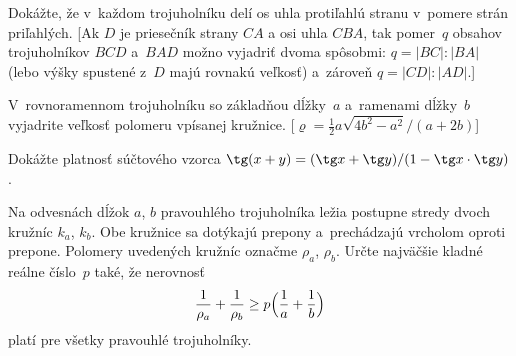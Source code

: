 {
Dokážte, že v~každom trojuholníku delí os uhla protiľahlú stranu v~pomere strán priľahlých. [Ak $D$ je priesečník strany $CA$ a osi uhla $CBA$, tak pomer~$q$ obsahov trojuholníkov $BCD$ a~$BAD$ možno vyjadriť dvoma spôsobmi: $q=|BC|:|BA|$ (lebo výšky spustené z~$D$ majú rovnakú veľkosť) a~zároveň $q=|CD|:|AD|$.]

V~rovnoramennom trojuholníku so základňou dĺžky~$a$ a~ramenami dĺžky~$b$ vyjadrite veľkosť polomeru vpísanej kružnice. [$\varrho=\frac12a\sqrt{4b^2-a^2}/(a+2b)$]

Dokážte platnosť súčtového vzorca $\tg(x+y)=(\tg x+\tg y)/(1-\tg x\cdot\tg y)$.

\D
Na odvesnách dĺžok $a$, $b$ pravouhlého trojuholníka ležia postupne stredy dvoch kružníc $k_a$, $k_b$. Obe kružnice sa dotýkajú prepony a~prechádzajú vrcholom oproti prepone. Polomery uvedených kružníc označme $\rho_a$, $\rho_b$. Určte najväčšie kladné reálne číslo~$p$ také, že nerovnosť
$$
\frac{1}{\rho_a}+\frac{1}{\rho_b} \ge p\Bigl(\frac{1}{a}+\frac{1}{b}\Bigr)
$$
platí pre všetky pravouhlé trojuholníky.
\vpravo{[58--A--II--2]}
}

